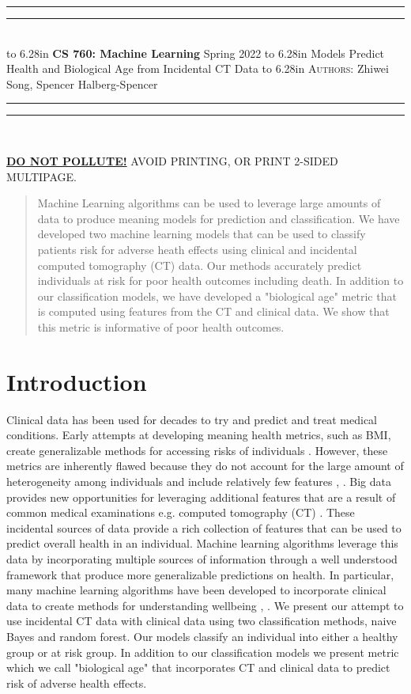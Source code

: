 \documentclass{article}
\newcommand{\lecture}[2]{
\pagestyle{myheadings}
\thispagestyle{plain}
\newpage
\noindent
\begin{center}
\rule{\textwidth}{1.6pt}\vspace*{-\baselineskip}\vspace*{2pt} %
\rule{\textwidth}{0.4pt}\\[1\baselineskip] %
\vbox{\vspace{2mm}
\hbox to 6.28in { {\bf CS 760: Machine Learning} \hfill Spring 2022 }
\vspace{4mm}
\hbox to 6.28in { {\Large \hfill #1  \hfill} }
\vspace{4mm}
\hbox to 6.28in { {\scshape Authors:}  #2 \hfill }}
\vspace{-2mm}
\rule{\textwidth}{0.4pt}\vspace*{-\baselineskip}\vspace{3.2pt} %
\rule{\textwidth}{1.6pt}\\[\baselineskip] %
\end{center}
\vspace*{4mm}
}
\begin{document}
\lecture{Models Predict Health and Biological Age from Incidental CT Data}{Zhiwei Song, Spencer Halberg-Spencer}

\begin{center}
{\Large {\sf \underline{\textbf{DO NOT POLLUTE!}} AVOID PRINTING, OR PRINT 2-SIDED MULTIPAGE.}}
\end{center}

\begin{abstract}
Machine Learning algorithms can be used to leverage large amounts of data to produce meaning models for prediction and classification. We have developed two machine learning models that can be used to classify patients risk for adverse heath effects using clinical and incidental computed tomography (CT) data. Our methods accurately predict individuals at risk for poor health outcomes including death. In addition to our classification models, we have developed a "biological age" metric that is computed using features from the CT and clinical data. We show that this metric is informative of poor health outcomes. 
\end{abstract}

\section{Introduction}
Clinical data has been used for decades to try and predict and treat medical conditions. Early attempts at developing meaning health metrics, such as BMI, create generalizable methods for accessing risks of individuals \cite{metropolitan1959new}. However, these metrics are inherently flawed because they do not account for the large amount of heterogeneity among individuals and include relatively few features \cite{freedmanValidityBMIIndicator2009}, \cite{nuttallBodyMassIndex2015}. Big data provides new opportunities for leveraging additional features that are a result of common medical examinations e.g. computed tomography (CT) \cite{hulsenBigDataPrecision2019}.  These incidental sources of data provide a rich collection of features that can be used to predict overall health in an individual. Machine learning algorithms leverage this data by incorporating multiple sources of information through a well understood framework that produce more generalizable predictions on health. In particular, many machine learning algorithms have been developed to incorporate clinical data to create methods for understanding wellbeing \cite{langarizadehApplyingNaiveBayesian2016}, \cite{goncalvesArtificialIntelligenceEarly2022}. We present our attempt to use incidental CT data with clinical data using two classification methods, naive Bayes and random forest.  Our models classify an individual into either a healthy group or at risk group. In addition to our classification models we present metric which we call "biological age" that incorporates  CT and clinical data to predict risk of adverse health effects. 
\end{document}
